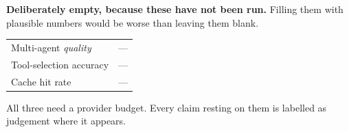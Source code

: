\begin{warning}
\textbf{Deliberately empty, because these have not been run.} Filling them with
plausible numbers would be worse than leaving them blank.

\begin{center}
\small
\begin{tabularx}{\linewidth}{@{}lX@{}}
\toprule
Multi-agent \emph{quality} & --- \\
Tool-selection accuracy & --- \\
Cache hit rate & --- \\
\bottomrule
\end{tabularx}
\end{center}

All three need a provider budget. Every claim resting on them is labelled as
judgement where it appears.
\end{warning}
